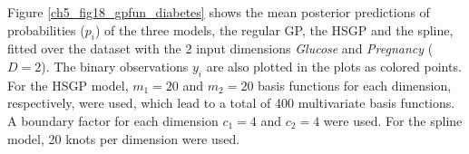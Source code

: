 \documentclass[onecolumn,a4paper,11pt]{article}
\begin{document}
Figure \ref{ch5_fig18_gpfun_diabetes} shows the mean posterior predictions of probabilities ($p_i$) of the three models, the regular GP, the HSGP and the spline, fitted over the dataset with the 2 input dimensions \textit{Glucose} and \textit{Pregnancy} ($D=2$). The binary observations $y_i$ are also plotted in the plots as colored points. For the HSGP model, $m_1=20$ and $m_2=20$ basis functions for each dimension, respectively, were used, which lead to a total of 400 multivariate basis functions. A boundary factor for each dimension $c_1=4$ and $c_2=4$ were used. For the spline model, 20 knots per dimension were used.
%
\begin{figure}
\centering
{}

\end{figure}
\end{document}
